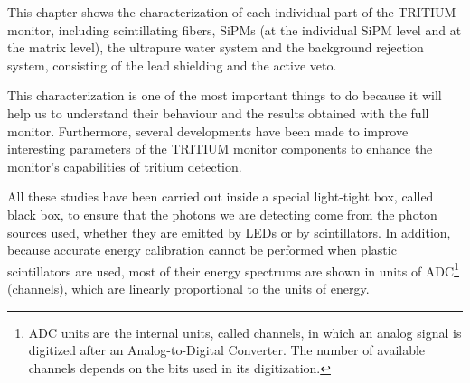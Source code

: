 This chapter shows the characterization of each individual part of the TRITIUM monitor, including scintillating fibers, SiPMs (at the individual SiPM level and at the matrix level), the ultrapure water system and the background rejection system, consisting of the lead shielding and the active veto. 

This characterization is one of the most important things to do because it will help us to understand their behaviour and the results obtained with the full monitor. Furthermore, several developments have been made  to improve interesting parameters of the TRITIUM monitor components to enhance the monitor's capabilities of tritium detection.

All these studies have been carried out inside a special light-tight box, called black box, to ensure that the photons we are detecting come from the photon sources used, whether they are emitted by LEDs or by scintillators. In addition, because accurate energy calibration cannot be performed when plastic scintillators are used, most of their energy spectrums are shown in units of ADC\footnote{ADC units are the internal units, called channels, in which an analog signal is digitized after an Analog-to-Digital Converter. The number of available channels depends on the bits used in its digitization.} (channels), which are linearly proportional to the units of energy.